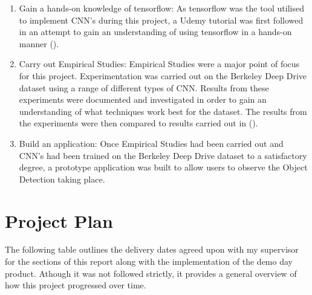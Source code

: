 \documentclass[12pt]{report}
\begin{document}
\begin{flushleft}
\begin{enumerate}
\item Gain a hands-on knowledge of tensorflow: As tensorflow was the tool utilised to implement CNN's during this project, a Udemy tutorial was first followed in an attempt to gain an understanding of using tensorflow in a hands-on manner (\cite{udemy}).
\item Carry out Empirical Studies: Empirical Studies were a major point of focus for this project. Experimentation was carried out on the Berkeley Deep Drive dataset using a range of different types of CNN. Results from these experiments were documented and investigated in order to gain an understanding of what techniques work best for the dataset. The results from the experiments were then compared to results carried out in (\cite{yu2018bdd100k}).
\item Build an application: Once Empirical Studies had been carried out and CNN's had been trained on the Berkeley Deep Drive dataset to a satisfactory degree, a prototype application was built to allow users to observe the Object Detection taking place.
\end{enumerate}
\end{flushleft}

\newpage
\section{Project Plan}
\begin{flushleft}
The following table outlines the delivery dates agreed upon with my supervisor for the sections of this report along with the implementation of the demo day product. Athough it was not followed strictly, it provides a general overview of how this project progressed over time.
\end{flushleft}
\end{document}
